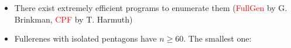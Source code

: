 \documentclass{beamer}
\begin{document}
{\begin{itemize}
\begin{center}
\begin{minipage}[b]{2.3cm}
\par
\end{minipage}
\end{center}
\item There exist extremely efficient programs to enumerate them (\textcolor{red}{FullGen} by G. Brinkman, \textcolor{red}{CPF} by T. Harmuth)
\item Fullerenes with isolated pentagons have $n\geq 60$. The smallest one:
\begin{center}
\begin{minipage}{4.5cm}
\centering

\end{minipage}
\end{center}
\end{itemize}}
\end{document}
